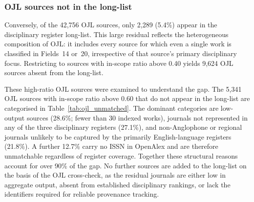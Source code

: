 \subsubsection*{OJL sources not in the long-list}

Conversely, of the 42{,}756 OJL sources, only 2{,}289 (5.4\%) appear in the
disciplinary register long-list.
This large residual reflects the heterogeneous composition of OJL:
it includes every source for which even a single work is classified in
Fields~14 or~20, irrespective of that source's primary disciplinary focus.
Restricting to sources with in-scope ratio above 0.40 yields 9{,}624 OJL sources
absent from the long-list.

These high-ratio OJL sources were examined to understand the gap.
The 5{,}341 OJL sources with in-scope ratio above 0.60 that do not appear in the
long-list are categorised in Table~\ref{tab:ojl_unmatched}.
The dominant categories are low-output sources (28.6\%; fewer than 30 indexed
works), journals not represented in any of the three disciplinary registers
(27.1\%), and non-Anglophone or regional journals unlikely to be captured by the
primarily English-language registers (21.8\%).
A further 12.7\% carry no ISSN in OpenAlex and are therefore unmatchable regardless
of register coverage.
Together these structural reasons account for over 90\% of the gap.
No further sources are added to the long-list on the basis of the OJL cross-check,
as the residual journals are either low in aggregate output, absent from established
disciplinary rankings, or lack the identifiers required for reliable provenance tracking.

